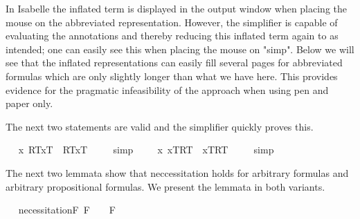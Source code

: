 \begin{isabellebody}
\begin{isamarkuptext}
  In Isabelle the inflated term is displayed in the output window when placing the mouse on the abbreviated representation.
  However, the simplifier is capable of evaluating the annotations and thereby reducing this inflated term again 
  to  as intended; one can easily see this when placing the mouse on "simp". 
  Below we will see that the inflated representations can 
  easily fill several pages for abbreviated formulas which are only slightly longer than what we have here. 
  This provides evidence for the pragmatic infeasibility of the approach when using pen and paper only.%
\end{isamarkuptext}%
\isamarkuptrue%
%
\begin{isamarkuptext}%
The next two statements are valid and the simplifier quickly proves this.%
\end{isamarkuptext}%
\isamarkuptrue%
\ \isamarkupfalse%
\ {\isachardoublequoteopen}{\isacharbrackleft}{\isacharparenleft}\isactrlbold {\isasymforall}x{\isachardot}\ {\isasymlparr}R\isactrlsup T{\isacharcomma}x\isactrlsup T{\isasymrparr}\ \isactrlbold {\isasymrightarrow}\ {\isasymlparr}R\isactrlsup T{\isacharcomma}x\isactrlsup T{\isasymrparr}{\isacharparenright}{\isacharbrackright}\ {\isacharequal}\ {\isasymtop}{\isachardoublequoteclose}%
\isadelimproof
\ %
\endisadelimproof
%
\isatagproof
{}\isamarkupfalse%
\ simp%
\endisatagproof
{\isafoldproof}%
%
\isadelimproof
%
\endisadelimproof
\ \isanewline
\ \isamarkupfalse%
\ {\isachardoublequoteopen}{\isacharbrackleft}{\isacharparenleft}\isactrlbold {\isasymforall}x{\isachardot}\ {\isasymlbrace}x\isactrlsup T{\isacharcomma}R\isactrlsup T{\isasymrbrace}\ \isactrlbold {\isasymrightarrow}\ {\isasymlbrace}x\isactrlsup T{\isacharcomma}R\isactrlsup T{\isasymrbrace}{\isacharparenright}{\isacharbrackright}\ {\isacharequal}\ {\isasymtop}{\isachardoublequoteclose}%
\isadelimproof
\ %
\endisadelimproof
%
\isatagproof
{}\isamarkupfalse%
\ simp%
\endisatagproof
{\isafoldproof}%
%
\isadelimproof
%
\endisadelimproof
%
\isamarkuptrue%
%
\begin{isamarkuptext}%
The next two lemmata show that neccessitation holds for arbitrary formulas 
  and arbitrary propositional formulas. We present the lemmata in both variants.%
\end{isamarkuptext}%
\isamarkuptrue%
\ \isamarkupfalse%
\ necessitationF{\isacharcolon}\ {\isachardoublequoteopen}{\isacharbrackleft}{\isasymphi}\isactrlsup F{\isacharbrackright}\ {\isacharequal}\ {\isasymtop}\ {\isasymlongrightarrow}\ {\isacharbrackleft}\isactrlbold {\isasymbox}{\isasymphi}\isactrlsup F{\isacharbrackright}\ {\isacharequal}\ {\isasymtop}{\isachardoublequoteclose}%

\end{isabellebody}
